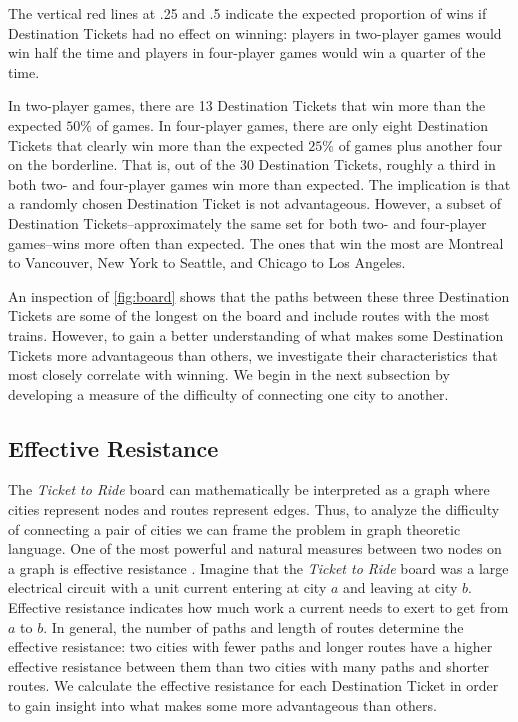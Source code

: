 \begin{multicols}{2}

The vertical red lines at .25 and .5 indicate
the expected proportion of wins if Destination Tickets
had no effect on winning: players in two-player games
would win half the time and players in four-player games
would win a quarter of the time.

In two-player games, there are 13 Destination Tickets 
that win more than the expected $50\%$ of games.
In four-player games, there are only eight Destination Tickets
that clearly win more than the expected $25\%$ of games plus
another four on the borderline.
That is, out of the 30 Destination Tickets, roughly a third
in both two- and four-player games win more than expected.
The implication is that a randomly chosen Destination 
Ticket is not advantageous.
However, a subset of Destination Tickets--approximately the same
set for both two- and four-player games--wins more often than expected.
The ones that win the most are Montreal to Vancouver,
New York to Seattle, and Chicago to Los Angeles.

An inspection of \cref{fig:board} shows that the paths between 
these three Destination Tickets are some of the longest on the board 
and include routes with the most trains.
However, to gain a better understanding of what makes some
Destination Tickets more advantageous than others,
we investigate their characteristics
that most closely correlate with winning.
We begin in the next subsection by developing a measure
of the difficulty of connecting one city to another.

\subsection{Effective Resistance}
The \textit{Ticket to Ride} board can mathematically
be interpreted as a graph where cities represent
nodes and routes represent edges.
Thus, to analyze the difficulty of connecting a
pair of cities we can frame the problem in graph theoretic language.
One of the most powerful and natural measures
between two nodes on a graph is effective resistance
\cite{ellens2011effective}.
Imagine that the \textit{Ticket to Ride} board was
a large electrical circuit with a unit current
entering at city $a$ and leaving at city $b$.
Effective resistance indicates
how much work a current needs to exert
to get from $a$ to $b$.
In general, the number of paths and length of routes 
determine the effective resistance:
two cities with fewer paths and longer routes
have a higher effective resistance between them
than two cities with many paths and shorter routes.
We calculate the effective resistance for each 
Destination Ticket in order to gain insight
into what makes some more advantageous than others.


\end{multicols}
